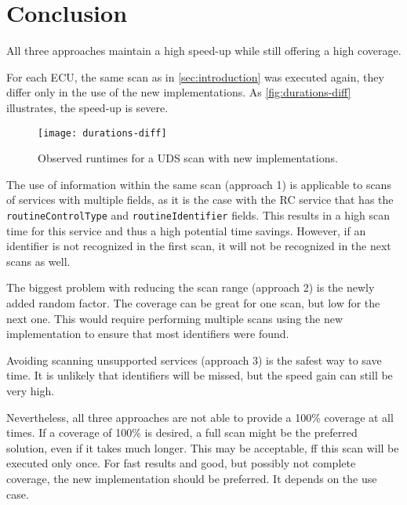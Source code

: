 \section{Conclusion}

All three approaches maintain a high speed-up while still offering a high coverage.

For each ECU, the same scan as in \autoref{sec:introduction} was executed again, they differ only in the use of the new implementations. As \autoref{fig:durations-diff} illustrates, the speed-up is severe.

\begin{figure}[h]
    \centering
    \texttt{[image: durations-diff]}
    \caption{Observed runtimes for a UDS scan with new implementations.}
    \label{fig:durations-diff}
\end{figure}

The use of information within the same scan (approach 1) is applicable to scans of services with multiple fields, as it is the case with the RC service that has the \texttt{routineControlType} and \texttt{routineIdentifier} fields. This results in a high scan time for this service and thus a high potential time savings. However, if an identifier is not recognized in the first scan, it will not be recognized in the next scans as well.

The biggest problem with reducing the scan range (approach 2) is the newly added random factor. The coverage can be great for one scan, but low for the next one. This would require performing multiple scans using the new implementation to ensure that most identifiers were found.

Avoiding scanning unsupported services (approach 3) is the safest way to save time. It is unlikely that identifiers will be missed, but the speed gain can still be very high.

Nevertheless, all three approaches are not able to provide a 100\% coverage at all times. 
If a coverage of 100\% is desired, a full scan might be the preferred solution, even if it takes much longer. This may be acceptable, ff this scan will be executed only once. For fast results and good, but possibly not complete coverage, the new implementation should be preferred. It depends on the use case.
